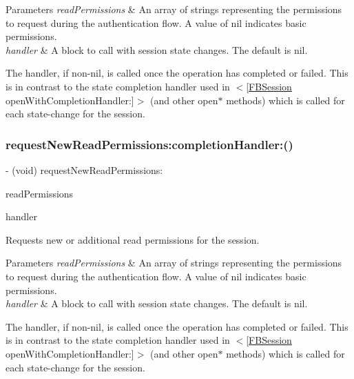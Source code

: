 \begin{DoxyParams}{Parameters}
{\em read\+Permissions} & An array of strings representing the permissions to request during the authentication flow. A value of nil indicates basic permissions.\\
\hline
{\em handler} & A block to call with session state changes. The default is nil.\\
\hline
\end{DoxyParams}
The handler, if non-\/nil, is called once the operation has completed or failed. This is in contrast to the state completion handler used in $<$\mbox{[}\hyperlink{interfaceFBSession}{F\+B\+Session} open\+With\+Completion\+Handler\+:\mbox{]}$>$ (and other {\ttfamily open$\ast$} methods) which is called for each state-\/change for the session. \mbox{\label{interfaceFBSession_a14cf87331489399e4317bda2c718d3a3}} 
\subsubsection{\texorpdfstring{request\+New\+Read\+Permissions\+:completion\+Handler\+:()}{requestNewReadPermissions:completionHandler:()}\hspace{0.1cm}{\footnotesize\ttfamily [5/5]}}
{\footnotesize\ttfamily -\/ (void) request\+New\+Read\+Permissions\+: \begin{DoxyParamCaption}\item[{(N\+S\+Array $\ast$)}]{read\+Permissions }\item[{completionHandler:(F\+B\+Session\+Request\+Permission\+Result\+Handler)}]{handler }\end{DoxyParamCaption}}

Requests new or additional read permissions for the session.


\begin{DoxyParams}{Parameters}
{\em read\+Permissions} & An array of strings representing the permissions to request during the authentication flow. A value of nil indicates basic permissions.\\
\hline
{\em handler} & A block to call with session state changes. The default is nil.\\
\hline
\end{DoxyParams}
The handler, if non-\/nil, is called once the operation has completed or failed. This is in contrast to the state completion handler used in $<$\mbox{[}\hyperlink{interfaceFBSession}{F\+B\+Session} open\+With\+Completion\+Handler\+:\mbox{]}$>$ (and other {\ttfamily open$\ast$} methods) which is called for each state-\/change for the session. \mbox{\label{interfaceFBSession_af1b30bea1e3251f8d75f76b10369756e}} 
